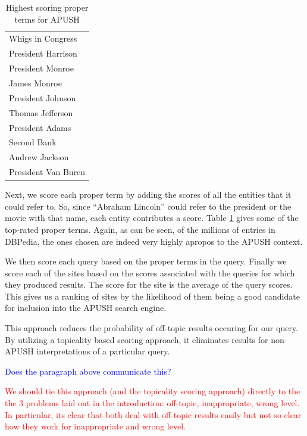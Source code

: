 \documentclass[pdfpagelabels=false,plainpages=true]{acm_proc_article-sp}
\begin{document}
\begin{table}
\begin{center}
\begin{tabular}{|l|} \hline
Whigs in Congress \\
President Harrison \\
President Monroe \\
James Monroe \\
President Johnson \\
Thomas Jefferson \\
President Adams \\
Second Bank \\
Andrew Jackson \\
President Van Buren \\
\hline\end{tabular}
\caption{Highest scoring proper terms for APUSH}
\label{tab-terms}
\end{center}
\end{table}

Next, we score each proper term by adding the scores of all the entities that it
could refer to. So, since ``Abraham Lincoln'' could refer to the president or the
movie with that name, each entity contributes a score. Table \ref{tab-terms}
gives some of the top-rated proper terms. Again, as can be seen, of the millions
of entries in DBPedia, the ones chosen are indeed very highly apropos to the
APUSH context.  

We then score each query based on the proper terms in the query. Finally we
score each of the sites based on the scores associated with the queries for
which they produced results. The score for the site is the average of the query
scores. This gives us a ranking of sites by the likelihood of them being a good
candidate for inclusion into the APUSH search engine. 

This approach reduces the probability of off-topic results occuring
for our query. By utilizing a topicality based scoring approach, it
eliminates results for non-APUSH interpretations of a
particular query.


\textcolor{blue}{Does the paragraph above communicate this?}

\textcolor{red}{We should tie this approach (and the topicality scoring
  approach) directly to the the 3 problems laid out in the introduction:
  off-topic, inappropriate, wrong level. In particular, 
  its clear that both deal with off-topic results easily but not so clear how
  they work for inappropriate and wrong level.}
\end{document}
